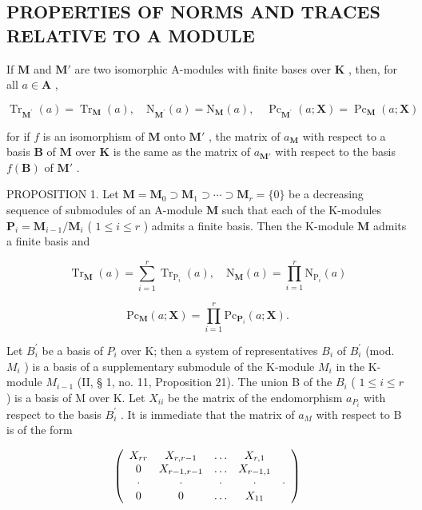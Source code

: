 \subsection{PROPERTIES OF NORMS AND TRACES RELATIVE TO A MODULE}

If \(\mathbf{M}\) and \(\mathbf{M}'\) are two isomorphic A-modules with finite bases over \(\mathbf{K}\) , then, for all \(a \in \mathbf{A}\) ,

\[
\operatorname{Tr} _ {\mathbf {M} ^ {\prime}} (a) = \operatorname{Tr} _ {\mathbf {M}} (a), \quad \mathrm{N} _ {\mathbf {M} ^ {\prime}} (a) = \mathrm{N} _ {\mathbf {M}} (a), \quad \operatorname{Pc} _ {\mathbf {M} ^ {\prime}} (a; \mathbf {X}) = \operatorname{Pc} _ {\mathbf {M}} (a; \mathbf {X})\tag{14}
\]

for if \(f\) is an isomorphism of \(\mathbf{M}\) onto \(\mathbf{M}'\) , the matrix of \(a_{\mathbf{M}}\) with respect to a basis \(\mathbf{B}\) of \(\mathbf{M}\) over \(\mathbf{K}\) is the same as the matrix of \(a_{\mathbf{M}'}\) with respect to the basis \(f(\mathbf{B})\) of \(\mathbf{M}'\) .

PROPOSITION 1. Let \(\mathbf{M} = \mathbf{M}_0 \supset \mathbf{M}_1 \supset \cdots \supset \mathbf{M}_r = \{0\}\) be a decreasing sequence of submodules of an A-module \(\mathbf{M}\) such that each of the K-modules \(\mathbf{P}_i = \mathbf{M}_{i-1} / \mathbf{M}_i\) ( \(1 \leqslant i \leqslant r\) ) admits a finite basis. Then the K-module \(\mathbf{M}\) admits a finite basis and

\[
\operatorname{Tr} _ {\mathbf {M}} (a) = \sum_ {i = 1} ^ {r} \operatorname{Tr} _ {\mathrm{P} _ {i}} (a), \quad \mathrm{N} _ {\mathbf {M}} (a) = \prod_ {i = 1} ^ {r} \mathrm{N} _ {\mathrm{P} _ {i}} (a)\tag{15}
\]

\[
\mathrm{Pc} _ {\mathbf {M}} (a; \mathbf {X}) = \prod_ {i = 1} ^ {r} \mathrm{Pc} _ {\mathbf {P} _ {i}} (a; \mathbf {X}).
\]

Let \(B_{i}^{\prime}\) be a basis of \(P_{i}\) over K; then a system of representatives \(B_{i}\) of \(B_{i}^{\prime}\) (mod. \(M_{i}\) ) is a basis of a supplementary submodule of the K-module \(M_{i}\) in the K-module \(M_{i-1}\) (II, § 1, no. 11, Proposition 21). The union B of the \(B_{i}\) ( \(1 \leqslant i \leqslant r\) ) is a basis of M over K. Let \(X_{ii}\) be the matrix of the endomorphism \(a_{P_{i}}\) with respect to the basis \(B_{i}^{\prime}\) . It is immediate that the matrix of \(a_{M}\) with respect to B is of the form

\[
\left( \begin{array}{c c c c c} X _ {r r} & X _ {r, r - 1} & \ldots & X _ {r, 1} \\ 0 & X _ {r - 1, r - 1} & \ldots & X _ {r - 1, 1} \\ \cdot & \cdot & \cdot & \cdot & \cdot \\ 0 & 0 & \ldots & X _ {1 1} \end{array} \right)
\]

